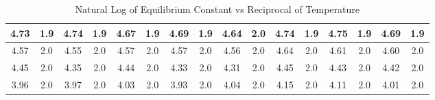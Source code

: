 \begin{table}[H]
{\begin{tabular}{|cccccccccccccccc|}
\multicolumn{1}{|c|}{4.73}    & \multicolumn{1}{c|}{1.9}                                & \multicolumn{1}{c|}{4.74}    & \multicolumn{1}{c|}{1.9}                                & \multicolumn{1}{c|}{4.67}    & \multicolumn{1}{c|}{1.9}                                & \multicolumn{1}{c|}{4.69}     & \multicolumn{1}{c|}{1.9}                                 & \multicolumn{1}{c|}{4.64}     & \multicolumn{1}{c|}{2.0}                                 & \multicolumn{1}{c|}{4.74}     & \multicolumn{1}{c|}{1.9}                                 & \multicolumn{1}{c|}{4.75}     & \multicolumn{1}{c|}{1.9}                                 & \multicolumn{1}{c|}{4.69}     & 1.9                                 \\ \hline
\multicolumn{1}{|c|}{4.57}    & \multicolumn{1}{c|}{2.0}                                & \multicolumn{1}{c|}{4.55}    & \multicolumn{1}{c|}{2.0}                                & \multicolumn{1}{c|}{4.57}    & \multicolumn{1}{c|}{2.0}                                & \multicolumn{1}{c|}{4.57}     & \multicolumn{1}{c|}{2.0}                                 & \multicolumn{1}{c|}{4.56}     & \multicolumn{1}{c|}{2.0}                                 & \multicolumn{1}{c|}{4.64}     & \multicolumn{1}{c|}{2.0}                                 & \multicolumn{1}{c|}{4.61}     & \multicolumn{1}{c|}{2.0}                                 & \multicolumn{1}{c|}{4.60}     & 2.0                                 \\ \hline
\multicolumn{1}{|c|}{4.45}    & \multicolumn{1}{c|}{2.0}                                & \multicolumn{1}{c|}{4.35}    & \multicolumn{1}{c|}{2.0}                                & \multicolumn{1}{c|}{4.44}    & \multicolumn{1}{c|}{2.0}                                & \multicolumn{1}{c|}{4.33}     & \multicolumn{1}{c|}{2.0}                                 & \multicolumn{1}{c|}{4.31}     & \multicolumn{1}{c|}{2.0}                                 & \multicolumn{1}{c|}{4.45}     & \multicolumn{1}{c|}{2.0}                                 & \multicolumn{1}{c|}{4.43}     & \multicolumn{1}{c|}{2.0}                                 & \multicolumn{1}{c|}{4.42}     & 2.0                                 \\ \hline
\multicolumn{1}{|c|}{3.96}    & \multicolumn{1}{c|}{2.0}                                & \multicolumn{1}{c|}{3.97}    & \multicolumn{1}{c|}{2.0}                                & \multicolumn{1}{c|}{4.03}    & \multicolumn{1}{c|}{2.0}                                & \multicolumn{1}{c|}{3.93}     & \multicolumn{1}{c|}{2.0}                                 & \multicolumn{1}{c|}{4.04}     & \multicolumn{1}{c|}{2.0}                                 & \multicolumn{1}{c|}{4.15}     & \multicolumn{1}{c|}{2.0}                                 & \multicolumn{1}{c|}{4.11}     & \multicolumn{1}{c|}{2.0}                                 & \multicolumn{1}{c|}{4.01}     & 2.0                                 \\ \hline
\end{tabular}}
\caption{Natural Log of Equilibrium Constant vs Reciprocal of Temperature}
\label{table:after_linearization}
\end{table}

